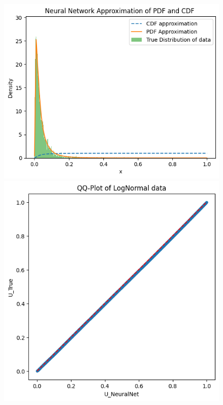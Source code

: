 \begin{figure}
\begin{minipage}{0.45\textwidth}
\begin{minipage}{0.48\textwidth}
        \end{minipage}
    \end{minipage}
    \hfill
    \begin{minipage}{0.45\textwidth}
        \centering
        \begin{minipage}{0.48\textwidth}
            \centering
            \includegraphics[width=\textwidth]{5ResultsDiscussion/pictures/MarginalTest/LognormalHistogram.png}
        \end{minipage}
        \hfill
        \begin{minipage}{0.48\textwidth}
            \centering
            \includegraphics[width=\textwidth]{5ResultsDiscussion/pictures/MarginalTest/LognormalQQ.png}
        \end{minipage}
    \end{minipage}


\end{figure}
